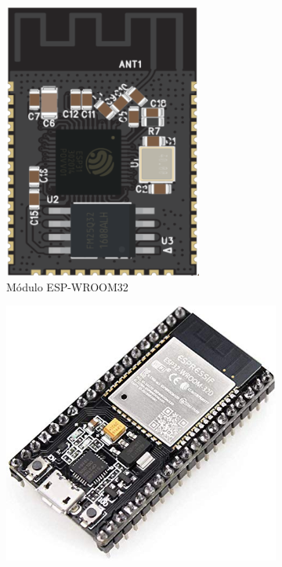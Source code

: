 \begin{figure}[h!]
\centering
\begin{subfigure}[b]{0.2\linewidth}
	\includegraphics[width=\linewidth]{./Figures/ESPMOD.png}
	\caption{Módulo ESP-WROOM32}
	\label{fig:ESP1}
\end{subfigure}\hspace{25mm}
\begin{subfigure}[b]{0.3\linewidth}
	\includegraphics[width=\linewidth]{./Figures/ESP322.jpg}

\end{subfigure}
\end{figure}
